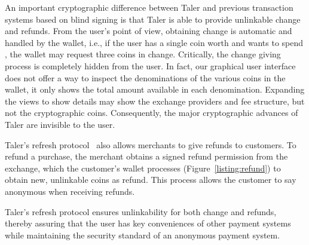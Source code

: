 \documentclass{llncs}
\begin{document}
An important cryptographic difference between Taler and previous
transaction systems based on blind signing is that Taler is able to
provide unlinkable change and refunds.  From the user's point of view,
obtaining change is automatic and handled by the wallet, i.e., if the
user has a single coin worth  and wants to spend , the
wallet may request three  coins in change. Critically, the
change giving process is completely hidden from the user.
In fact, our graphical user
interface does not offer a way to inspect the denominations of the
various coins in the wallet, it only shows the total amount available
in each denomination.  Expanding the views to show details may show
the exchange providers and fee structure, but not the cryptographic
coins.  Consequently, the major cryptographic advances of Taler are
invisible to the user.

Taler's refresh protocol~\cite{talercrypto} also allows merchants to give
refunds to customers. To refund a purchase, the merchant obtains a signed refund permission
from the exchange, which the customer's wallet processes
(Figure~\ref{listing:refund}) to obtain new, unlinkable coins as refund.
This process allows the customer to say anonymous when receiving refunds.

Taler's refresh protocol ensures unlinkability for both change and
refunds, thereby assuring that the user has key conveniences of other
payment systems while maintaining the security standard of an
anonymous payment system.
\end{document}
